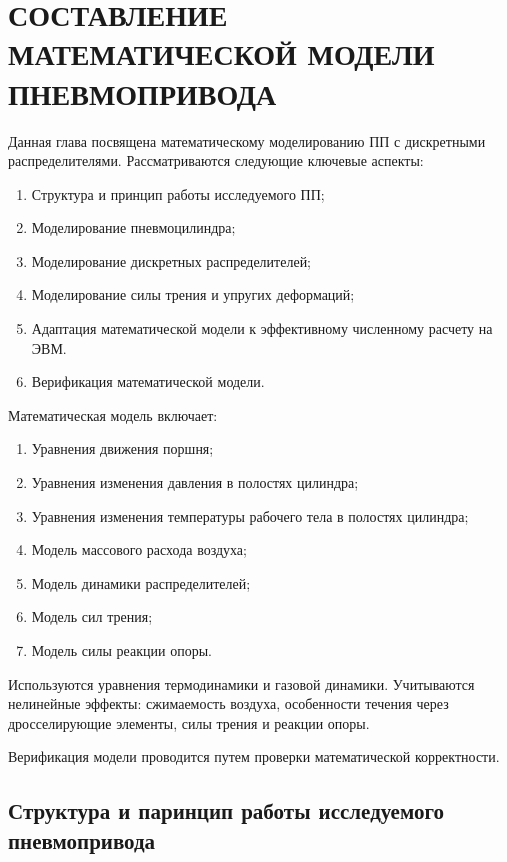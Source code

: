 \chapter{СОСТАВЛЕНИЕ МАТЕМАТИЧЕСКОЙ МОДЕЛИ ПНЕВМОПРИВОДА}\label{ch:ch2}
Данная глава посвящена математическому моделированию ПП
с дискретными распределителями. Рассматриваются следующие ключевые аспекты:

\begin{enumerate}
    \item Структура и принцип работы исследуемого ПП;
    \item Моделирование пневмоцилиндра;
    \item Моделирование дискретных распределителей;
    \item Моделирование силы трения и упругих деформаций;
    \item Адаптация математической модели к эффективному численному расчету на ЭВМ.
    \item Верификация математической модели.
\end{enumerate}

Математическая модель включает:

\begin{enumerate}
    \item Уравнения движения поршня;
    \item Уравнения изменения давления в полостях цилиндра;
    \item Уравнения изменения температуры рабочего тела в полостях цилиндра;
    \item Модель массового расхода воздуха;
    \item Модель динамики распределителей;
    \item Модель сил трения;
    \item Модель силы реакции опоры.
\end{enumerate}

Используются уравнения термодинамики и газовой динамики. Учитываются нелинейные эффекты:
сжимаемость воздуха, особенности течения через дросселирующие элементы, силы трения и реакции опоры.

Верификация модели проводится путем проверки математической корректности.



\section{Структура и паринцип работы исследуемого пневмопривода}\label{sec:ch2/sec1}

